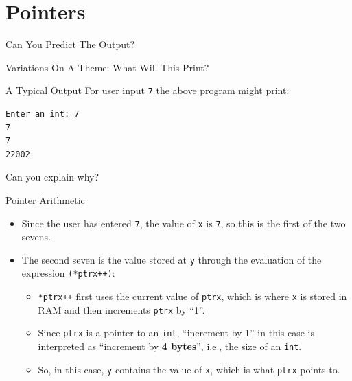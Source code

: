 \documentclass[aspectratio=169, 12pt]{beamer}
\begin{document}
	\section{Pointers}\label{sec:pointers}
	
	\sectionframe

	\begin{frame}{Can You Predict The Output?}
		
	\end{frame}

	\begin{frame}{Variations On A Theme: What Will This Print?}
		\scalebox{0.9}{%
		}
	\end{frame}

	\begin{frame}[fragile]{A Typical Output}
		For user input \texttt{7} the above program might print:
		\begin{verbatim}
Enter an int: 7
7
7
22002
\end{verbatim}
	Can you explain why?
	\end{frame}

	\begin{frame}{Pointer Arithmetic}
		\begin{itemize}
			\item Since the user has entered \texttt{7}, the value of \texttt{x} is \texttt{7}, so this is the first of the two sevens.
			\item The second seven is the value stored at \texttt{y} through the evaluation of the expression \texttt{(*ptrx++)}:
			\begin{itemize}
				\item \texttt{*ptrx++} first uses the current value of \texttt{ptrx}, which is where \texttt{x} is stored in RAM and then increments \texttt{ptrx} by ``1''.
				\item Since \texttt{ptrx} is a pointer to an \texttt{int}, ``increment  by 1'' in this case is interpreted as ``increment by \textbf{4 bytes}'', i.e., the size of an \texttt{int}.
				\item So, in this case, \texttt{y} contains the value of \texttt{x}, which is what \texttt{ptrx} points to.
			\end{itemize}
		\end{itemize}
	\end{frame}
	
\end{document}
